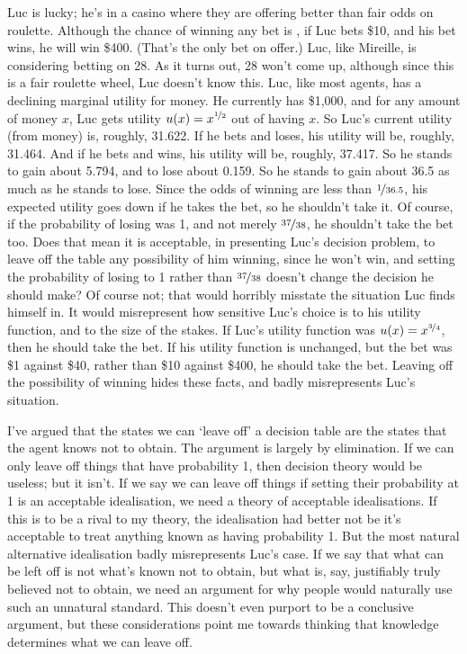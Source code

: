\documentclass[11pt,]{book}
\begin{document}
Luc is lucky; he's in a casino where they are offering better than fair odds on roulette. Although the chance of winning any bet is , if Luc bets \$10, and his bet wins, he will win \$400. (That's the only bet on offer.) Luc, like Mireille, is considering betting on 28. As it turns out, 28 won't come up, although since this is a fair roulette wheel, Luc doesn't know this. Luc, like most agents, has a declining marginal utility for money. He currently has \$1,000, and for any amount of money \(x\), Luc gets utility \(u(x) = x^{\nicefrac{1}{2}}\) out of having \(x\). So Luc's current utility (from money) is, roughly, 31.622. If he bets and loses, his utility will be, roughly, 31.464. And if he bets and wins, his utility will be, roughly, 37.417. So he stands to gain about 5.794, and to lose about 0.159. So he stands to gain about 36.5 as much as he stands to lose. Since the odds of winning are less than \(\nicefrac{1}{36.5}\), his expected utility goes down if he takes the bet, so he shouldn't take it. Of course, if the probability of losing was 1, and not merely \(\nicefrac{37}{38}\), he shouldn't take the bet too. Does that mean it is acceptable, in presenting Luc's decision problem, to leave off the table any possibility of him winning, since he won't win, and setting the probability of losing to 1 rather than \(\nicefrac{37}{38}\) doesn't change the decision he should make? Of course not; that would horribly misstate the situation Luc finds himself in. It would misrepresent how sensitive Luc's choice is to his utility function, and to the size of the stakes. If Luc's utility function was \(u(x) = x^{\nicefrac{3}{4}}\), then he should take the bet. If his utility function is unchanged, but the bet was \$1 against \$40, rather than \$10 against \$400, he should take the bet. Leaving off the possibility of winning hides these facts, and badly misrepresents Luc's situation.

I've argued that the states we can `leave off' a decision table are the states that the agent knows not to obtain. The argument is largely by elimination. If we can only leave off things that have probability 1, then decision theory would be useless; but it isn't. If we say we can leave off things if setting their probability at 1 is an acceptable idealisation, we need a theory of acceptable idealisations. If this is to be a rival to my theory, the idealisation had better not be it's acceptable to treat anything known as having probability 1. But the most natural alternative idealisation badly misrepresents Luc's case. If we say that what can be left off is not what's known not to obtain, but what is, say, justifiably truly believed not to obtain, we need an argument for why people would naturally use such an unnatural standard. This doesn't even purport to be a conclusive argument, but these considerations point me towards thinking that knowledge determines what we can leave off.
\end{document}
